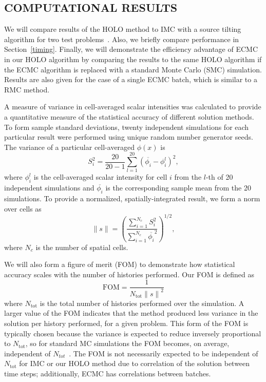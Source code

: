 \documentclass[12pt]{article}
\renewcommand{\ss}{\ensuremath{\|s\|}}
\newcommand{\FOM}{\ensuremath{\text{FOM}}}
\begin{document}
\begin{center}
\section{COMPUTATIONAL RESULTS}

We will compare results of the HOLO method to IMC with
a source tilting algorithm for two test problems~\cite{jayenne}.  
Also, we briefly compare performance in Section~\ref{timing}.
Finally,  we will demonstrate the efficiency advantage of ECMC in our HOLO
algorithm by comparing the results to the same HOLO algorithm if the ECMC algorithm
is replaced with a standard Monte Carlo (SMC) simulation.  Results are also given for
the case of a single ECMC batch, which is similar to a RMC method.

A measure of variance in cell-averaged scalar intensities was
calculated to provide a quantitative measure of the statistical accuracy of different solution
methods.  To form sample standard deviations, twenty independent simulations for each
particular result were performed using unique random number generator seeds.
The variance of a particular cell-averaged $\phi(x)$ is 
\begin{equation} 
    S_i^2 =  \frac{20}{20-1} \sum_{l=1}^{20} \left(\overline{\phi_{i}} -
    \phi_{i}^l\right)^2,
\end{equation}
where $\phi_{i}^l$ is the cell-averaged scalar intensity for cell $i$ from the $l$-th of 20 independent simulations and
$\overline{\phi_{i}}$ is the corresponding sample mean from the 20 simulations. To
provide a normalized, spatially-integrated result, we form a norm over cells as 
\begin{equation}
    \ss = \left({\frac{\sum\limits_{i=1}^{N_c}
S_i^2}{\sum\limits_{i=1}^{N_c}\overline{\phi_{i}}^2}}\right)^{1/2},
\end{equation}
where $N_c$ is the number of spatial cells. 

We will also form a figure of merit (FOM) to demonstrate how statistical accuracy
scales with the number of histories performed.  Our FOM is defined as
\begin{equation}
    \FOM = \frac{1}{N_{\text{tot}}\ss^2}
\end{equation}
where $N_{\text{tot}}$ is the total number of histories performed over the simulation.
A larger value of the FOM indicates that the method produced less variance in the
solution per history performed, for a given problem.  This form of the FOM
is typically chosen because the variance is expected to reduce inversely proportional
to $N_{\text{tot}}$, so for standard MC simulations the FOM becomes, on average, independent of
$N_{tot}$~\cite{shultis_mc}.  The FOM is not necessarily expected to be independent
of $N_{\text{tot}}$ for IMC or
our HOLO method due to correlation of the solution between time steps; additionally, ECMC
has correlations between batches.


\end{center}
\end{document}
